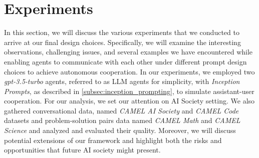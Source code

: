 \section{Experiments}\label{sec:experiments}


In this section, we will discuss the various experiments that we conducted to arrive at our final design choices. Specifically, we will examine the interesting observations, challenging issues, and several examples we have encountered while enabling agents to communicate with each other under different prompt design choices to achieve autonomous cooperation. In our experiments, we employed two \textit{gpt-3.5-turbo} agents, referred to as LLM agents for simplicity, with \textit{Inception Prompts}, as described in \secLabel \ref{subsec:inception_prompting}, to simulate assistant-user cooperation. For our analysis, we set our attention on AI Society setting. We also gathered conversational data, named \textit{CAMEL AI Society} and \textit{CAMEL Code} datasets and problem-solution pairs data named \textit{CAMEL Math} and \textit{CAMEL Science} and analyzed and evaluated their quality. Moreover, we will discuss potential extensions of our framework and highlight both the risks and opportunities that future AI society might present.


